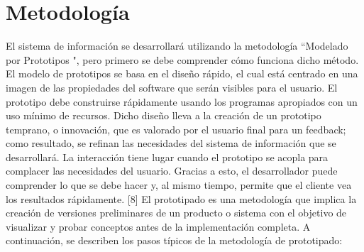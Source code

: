 \documentclass[12pt,onehalfspacing]{report}
\begin{document}
\section{Metodología}
El sistema de información se desarrollará utilizando la metodología “Modelado por Prototipos ", pero primero se debe comprender cómo funciona dicho método. El modelo de prototipos se basa en el diseño rápido, el cual está centrado en una imagen de las propiedades del software que serán visibles para el usuario. El prototipo debe construirse rápidamente usando los programas apropiados con un uso mínimo de recursos. Dicho diseño lleva a la creación de un prototipo temprano, o innovación, que es valorado por el usuario final para un feedback; como resultado, se refinan las necesidades del sistema de información que se desarrollará. La interacción tiene lugar cuando el prototipo se acopla para complacer las necesidades del usuario. Gracias a esto, el desarrollador puede comprender lo que se debe hacer y, al mismo tiempo, permite que el cliente vea los resultados rápidamente. [8]
El prototipado es una metodología que implica la creación de versiones preliminares de un producto o sistema con el objetivo de visualizar y probar conceptos antes de la implementación completa. A continuación, se describen los pasos típicos de la metodología de prototipado:
\end{document}

